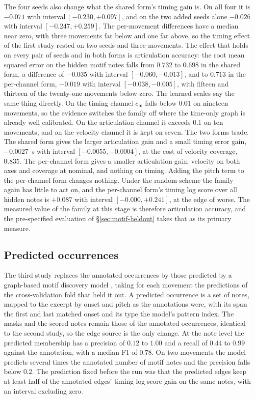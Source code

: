The four seeds also change what the shared form's timing gain is. On all
four it is $-0.071$ with interval $[-0.230, +0.097]$, and on the two added
seeds alone $-0.026$ with interval $[-0.247, +0.259]$. The per-movement
differences have a median near zero, with three movements far below and one
far above, so the timing effect of the first study rested on two seeds and
three movements. The effect that holds on every pair of seeds and in both
forms is articulation accuracy: the root mean squared error on the hidden
motif notes falls from $0.732$ to $0.698$ in the shared form, a difference
of $-0.035$ with interval $[-0.060, -0.013]$, and to $0.713$ in the
per-channel form, $-0.019$ with interval $[-0.038, -0.005]$, with fifteen
and thirteen of the twenty-one movements below zero. The learned scales say
the same thing directly. On the timing channel $c_{\mathrm m}$ falls below
$0.01$ on nineteen movements, so the evidence switches the family off
where the time-only graph is already well calibrated. On the articulation
channel it exceeds $0.1$ on ten movements, and on the velocity channel it
is kept on seven. The two forms trade. The shared form gives the larger
articulation gain and a small timing error gain, $-0.0027$~s with interval
$[-0.0055, -0.0004]$, at the cost of velocity coverage, $0.835$. The
per-channel form gives a smaller articulation gain, velocity on both axes
and coverage at nominal, and nothing on timing. Adding the pitch term to
the per-channel form changes nothing. Under the random scheme the family
again has little to act on, and the per-channel form's timing log score
over all hidden notes is $+0.087$ with interval $[-0.000, +0.241]$, at the
edge of worse. The measured value of the family at this stage is therefore
articulation accuracy, and the pre-specified evaluation of
\S\ref{sec:motif-heldout} takes that as its primary measure.

\subsection{Predicted occurrences}\label{sec:motif-stage2}
The third study replaces the annotated occurrences by those predicted by
a graph-based motif discovery model \cite{lalang2026motif}, taking for each
movement the predictions of the cross-validation fold that held it out.
A predicted occurrence is a set of notes, mapped to the excerpt by onset
and pitch as the annotations were, with its span the first and last
matched onset and its type the model's pattern index. The masks and the
scored notes remain those of the annotated occurrences, identical to the
second study, so the edge source is the only change. At the note level the
predicted membership has a precision of $0.12$ to $1.00$ and a recall of
$0.44$ to $0.99$ against the annotation, with a median F1 of $0.78$. On two
movements the model predicts several times the annotated number of motif
notes and the precision falls below $0.2$. The prediction fixed before the
run was that the predicted edges keep at least half of the annotated
edges' timing log-score gain on the same notes, with an interval excluding
zero.

